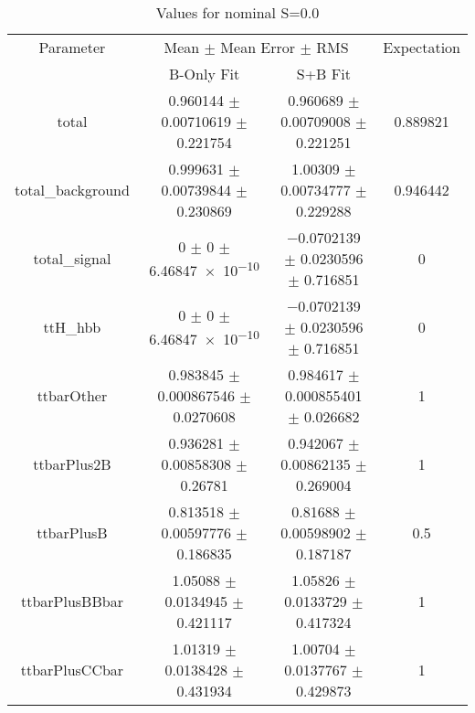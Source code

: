 \begin{table}
\centering
\caption{Values for nominal S=0.0}
\begin{tabular}{cccc}
\toprule
Parameter & \multicolumn{2}{c}{Mean $\pm$ Mean Error $\pm$ RMS} & Expectation\\
 & B-Only Fit & S+B Fit & \\
\midrule
total & \num{0.960144} $\pm$ \num{0.00710619} $\pm$ \num{0.221754} & \num{0.960689} $\pm$ \num{0.00709008} $\pm$ \num{0.221251} & \num{0.889821}\\
total\_background & \num{0.999631} $\pm$ \num{0.00739844} $\pm$ \num{0.230869} & \num{1.00309} $\pm$ \num{0.00734777} $\pm$ \num{0.229288} & \num{0.946442}\\
total\_signal & \num{0} $\pm$ \num{0} $\pm$ \num{6.46847e-10} & \num{-0.0702139} $\pm$ \num{0.0230596} $\pm$ \num{0.716851} & \num{0}\\
ttH\_hbb & \num{0} $\pm$ \num{0} $\pm$ \num{6.46847e-10} & \num{-0.0702139} $\pm$ \num{0.0230596} $\pm$ \num{0.716851} & \num{0}\\
ttbarOther & \num{0.983845} $\pm$ \num{0.000867546} $\pm$ \num{0.0270608} & \num{0.984617} $\pm$ \num{0.000855401} $\pm$ \num{0.026682} & \num{1}\\
ttbarPlus2B & \num{0.936281} $\pm$ \num{0.00858308} $\pm$ \num{0.26781} & \num{0.942067} $\pm$ \num{0.00862135} $\pm$ \num{0.269004} & \num{1}\\
ttbarPlusB & \num{0.813518} $\pm$ \num{0.00597776} $\pm$ \num{0.186835} & \num{0.81688} $\pm$ \num{0.00598902} $\pm$ \num{0.187187} & \num{0.5}\\
ttbarPlusBBbar & \num{1.05088} $\pm$ \num{0.0134945} $\pm$ \num{0.421117} & \num{1.05826} $\pm$ \num{0.0133729} $\pm$ \num{0.417324} & \num{1}\\
ttbarPlusCCbar & \num{1.01319} $\pm$ \num{0.0138428} $\pm$ \num{0.431934} & \num{1.00704} $\pm$ \num{0.0137767} $\pm$ \num{0.429873} & \num{1}\\
\bottomrule
\end{tabular}
\end{table}